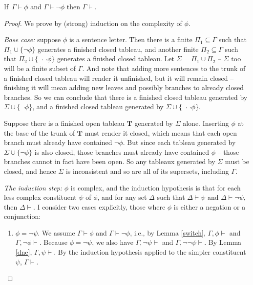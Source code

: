 \begin{theorem}[Cut] \label{cut}
	If\, $\Gamma \vdash \phi$ and $\Gamma \vdash \neg\phi$ then $\Gamma \vdash$.
\end{theorem}
\begin{proof}
	We prove by (strong) induction on the complexity of $\phi$. 

\noindent\emph{Base case:} suppose $\phi$ is a sentence letter. Then there is a finite  $\Pi_{1}\subseteq\Gamma$ such that $\Pi_{1} \cup \{\neg\phi\}$ generates a finished closed tableau, and another finite $\Pi_{2}\subseteq \Gamma$ such that $\Pi_{2}\cup\{¬¬\phi\}$ generates a finished closed tableau. Let $\Sigma=\Pi_{1}\cup \Pi_{2}$ – $\Sigma$ too will be a finite subset of $\Gamma$. And note that adding more sentences to the trunk of a finished closed tableau will render it unfinished, but it will remain closed – finishing it will mean adding new leaves and possibly branches to already closed branches. So we can conclude that there is a finished closed tableau generated by $\Sigma\cup\{¬\phi\}$, and a finished closed tableau generated by $\Sigma\cup\{¬¬\phi\}$.

Suppose there is a finished open tableau $\mathbf{T}$ generated by $\Sigma$ alone. Inserting $\phi$ at the base of the trunk of $\mathbf{T}$ must render it closed, which means that each open branch must already have contained $¬\phi$. But since each tableau generated by $\Sigma\cup\{¬\phi\}$ is also closed, those branches must already have contained $\phi$ – those branches cannot in fact have been open. So any tableaux generated by $\Sigma$ must be closed, and hence $\Sigma$ is inconsistent and so are all of its supersets, including $\Gamma$.
	
\noindent\emph{The induction step:} $\phi$ is complex, and the induction hypothesis is that for each less complex constituent $\psi$ of $\phi$, and for any set $\Delta$ such that $\Delta\vdash\psi$ and $\Delta\vdash\neg\psi$, then $\Delta \vdash$. I consider two cases explicitly, those where $\phi$ is either a negation or a conjunction: \begin{enumerate}
		\item $\phi = \neg\psi$. We assume $\Gamma \vdash \phi$ and $\Gamma \vdash \neg\phi$, i.e., by Lemma \ref{switch}, $\Gamma,\phi\vdash$ and $\Gamma,\neg\phi\vdash$. Because $\phi=\neg\psi$, we also have $\Gamma,\neg\psi\vdash$ and $\Gamma,\neg\neg\psi\vdash$. By Lemma \ref{dne}, $\Gamma,\psi \vdash$. By the induction hypothesis applied to the simpler constituent $\psi$, $\Gamma\vdash.$
	

\end{enumerate}
\end{proof}

